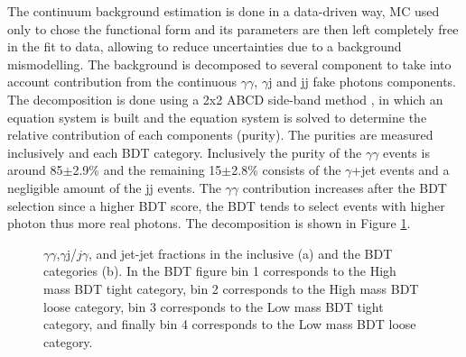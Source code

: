 The continuum background estimation is done in a data-driven way, MC used only to chose the functional form and its parameters are then left completely free in the fit to data, allowing to reduce uncertainties due to a background mismodelling. The background is decomposed to several component to take into account contribution from the continuous $\gamma\gamma$, $\gamma$j and jj fake photons components. The decomposition is done using a 2x2 ABCD side-band method \cite{ABCD}, in which an equation system is built and the equation system is solved to determine the relative contribution of each components (purity). The purities are measured inclusively and each BDT category. Inclusively the purity of the $\gamma\gamma$ events is around 85$\pm$2.9\% and the remaining 15$\pm$2.8\% consists of the $\gamma$+jet events and a negligible amount of the jj events. The $\gamma\gamma$ contribution increases after the BDT selection since a higher BDT score, the BDT tends to select events with higher photon \pT thus more real photons. The decomposition is shown in Figure \ref{fig:HHyybb:Modelling:Bkg:Decom}. 

\begin{figure}[ht]
    \centering
    \caption{$\gamma\gamma$,$\gamma$j/$j\gamma$, and jet-jet fractions in the inclusive (a) and the BDT categories (b). In the BDT figure bin 1 corresponds to the High mass BDT tight category, bin 2 corresponds to the High mass BDT loose category, bin 3 corresponds to the Low mass BDT tight category, and finally bin 4 corresponds to the Low mass BDT loose category.}
    \label{fig:HHyybb:Modelling:Bkg:Decom}
\end{figure}

